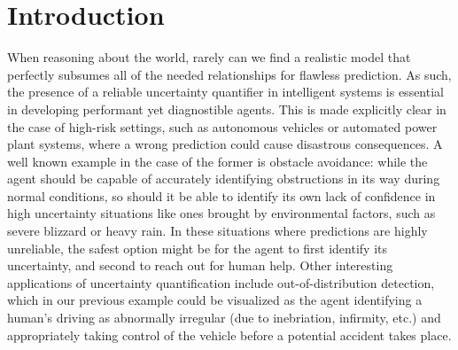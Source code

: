 \chapter{Introduction}






When reasoning about the world, rarely can we find a realistic model that perfectly subsumes all of
the needed relationships for flawless prediction. As such, the presence of a reliable uncertainty
quantifier in intelligent systems is essential in developing performant yet diagnostible agents.
This is made explicitly clear in the case of high-risk settings, such as autonomous vehicles or
automated power plant systems, where a wrong prediction could cause disastrous consequences. A well
known example in the case of the former is obstacle avoidance: while the agent should be capable of
accurately identifying obstructions in its way during normal conditions, so should it be able to
identify its own lack of confidence in high uncertainty situations like ones brought by
environmental factors, such as severe blizzard or heavy rain. In these situations where predictions
are highly unreliable, the safest option might be for the agent to first identify its uncertainty,
and second to reach out for human help. Other interesting applications of uncertainty
quantification include out-of-distribution detection, which in our previous example could be
visualized as the agent identifying a human's driving as abnormally irregular (due to inebriation,
infirmity, etc.) and appropriately taking control of the vehicle before a potential accident takes
place.

